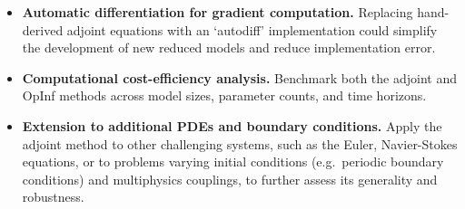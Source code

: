 \begin{itemize}
  \item \textbf{Automatic differentiation for gradient computation.}  
    Replacing hand-derived adjoint equations with an `autodiff' implementation could simplify the development of new reduced models and reduce implementation error.

  \item \textbf{Computational cost-efficiency analysis.} Benchmark both the adjoint and OpInf methods across model sizes, parameter counts, and time horizons. 

  \item \textbf{Extension to additional PDEs and boundary conditions.}  
    Apply the adjoint method to other challenging systems, such as the Euler, Navier-Stokes equations, or to problems varying initial conditions (e.g.\ periodic boundary conditions) and multiphysics couplings, to further assess its generality and robustness.
\end{itemize}
  
